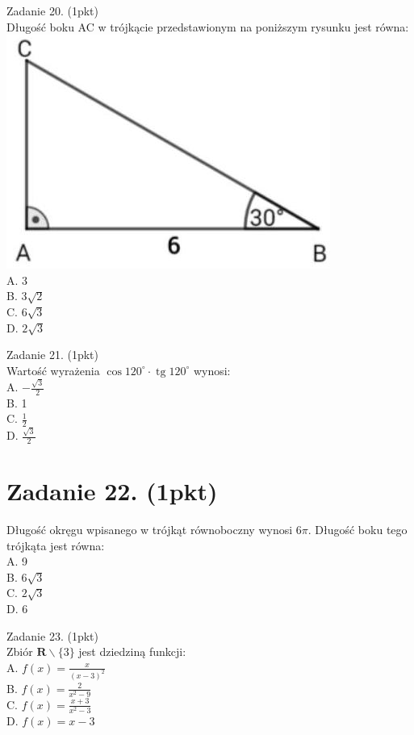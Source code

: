\documentclass[10pt]{article}
\begin{document}
Zadanie 20. (1pkt)\\
Długość boku AC w trójkącie przedstawionym na poniższym rysunku jest równa:\\
\includegraphics[max width=\textwidth, center]{2024_11_21_87037534e5fdc524263ag-06(1)}\\
A. 3\\
B. \(3 \sqrt{2}\)\\
C. \(6 \sqrt{3}\)\\
D. \(2 \sqrt{3}\)

Zadanie 21. (1pkt)\\
Wartość wyrażenia \(\cos 120^{\circ} \cdot \operatorname{tg} 120^{\circ}\) wynosi:\\
A. \(-\frac{\sqrt{3}}{2}\)\\
B. 1\\
C. \(\frac{1}{2}\)\\
D. \(\frac{\sqrt{3}}{2}\)

\section*{Zadanie 22. (1pkt)}
Długość okręgu wpisanego w trójkąt równoboczny wynosi \(6 \pi\). Długość boku tego trójkąta jest równa:\\
A. 9\\
B. \(6 \sqrt{3}\)\\
C. \(2 \sqrt{3}\)\\
D. 6

Zadanie 23. (1pkt)\\
Zbiór \(\boldsymbol{R} \backslash\{3\}\) jest dziedziną funkcji:\\
A. \(f(x)=\frac{x}{(x-3)^{2}}\)\\
B. \(f(x)=\frac{2}{x^{2}-9}\)\\
C. \(f(x)=\frac{x+3}{x^{2}-3}\)\\
D. \(f(x)=x-3\)
\end{document}
